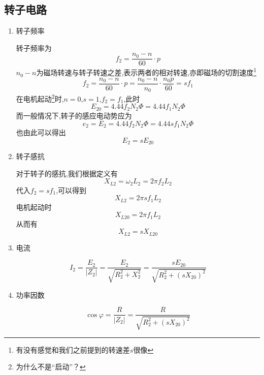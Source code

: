 \subsection{\K 转子电路}
\begin{enumerate}
    \item [\circledtext{1}]转子频率
    
    转子频率为
    \begin{equation*}
        f_2=\frac{n_0-n}{60}\cdot p
    \end{equation*}
    $n_0-n$为磁场转速与转子转速之差,表示两者的相对转速,亦即磁场的切割速度\footnote{有没有感觉和我们之前提到的转速差$s$很像}
    \begin{equation*}
        f_2=\frac{n_0-n}{60}\cdot p=\frac{n_0-n}{n_0}\cdot \frac{n_0p}{60}=sf_1
    \end{equation*}
    在电机起动\footnote{为什么不是“启动”？}时,$n=0$,$s=1$,$f_2=f_1$,此时
    \begin{equation*}
        E_{20}=4.44f_2N_2\varPhi =4.44f_1N_2\varPhi 
    \end{equation*}
    而一般情况下,转子的感应电动势应为
    \begin{equation*}
        e_2=E_2=4.44f_2N_2\varPhi =4.44sf_1N_2\varPhi 
    \end{equation*}
    也由此可以得出
    \begin{equation*}
        E_2=sE_{20}
    \end{equation*}

    \item [\circledtext{2}]转子感抗
    
    对于转子的感抗,我们根据定义有
    \begin{equation*}
        X_{L2}=\omega _2L_2=2\pi f_2L_2
    \end{equation*}
    代入$f_2=sf_1$,可以得到
    \begin{equation*}
        X_{L2}=2\pi sf_1L_2
    \end{equation*} 
    电机起动时
    \begin{equation*}
        X_{L20}=2\pi f_1L_2
    \end{equation*} 
    从而有
    \begin{equation*}
        X_{L2}=sX_{L20}
    \end{equation*} 
    \item[\circledtext{3}]电流
    
    \begin{equation*}
        I_2=\frac{E_2}{\left| Z_2 \right|}=\frac{E_2}{\sqrt{R_{2}^{2}+X_{2}^{2}}}=\frac{sE_{20}}{\sqrt{R_{2}^{2}+\left( sX_{20} \right) ^2}}
    \end{equation*}
    \item[\circledtext{4}]功率因数  
    
    \begin{equation*}
        \cos \varphi =\frac{R}{\left| Z_2 \right|}=\frac{R}{\sqrt{R_{2}^{2}+\left( sX_{20} \right) ^2}}
    \end{equation*}


\end{enumerate}

